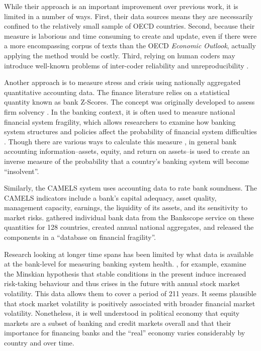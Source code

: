 \documentclass[]{article}
\begin{document}
While their approach is an important improvement over previous work, it is limited in a number of ways. First, their data sources means they are necessarily confined to the relatively small sample of OECD countries. Second, because their measure is laborious and time consuming to create and update, even if there were a more encompassing corpus of texts than the OECD \emph{Economic Outlook}, actually applying the method would be costly. Third, relying on human coders may introduce well-known problems of inter-coder reliability and unreproducibility \citep{Minhas2015}.

Another approach is to measure stress and crisis using nationally aggregated quantitative accounting data. The finance literature relies on a statistical quantity known as bank Z-Scores. The concept was originally developed to assess firm solvency \citep[see][]{roy1952}. In the banking context, it is often used to measure national financial system fragility, which allows researchers to examine how banking system structures and policies affect the probability of financial system difficulties \citep[e.g.][]{beck2013bank,vcihak2010islamic,laeven2009bank,uhde2009}. Though there are various ways to calculate this measure \citep[73]{Lepetit2013}, in general bank accounting information--assets, equity, and return on assets--is used to create an inverse measure of the probability that a country's banking system will become ``insolvent''.

Similarly, the CAMELS system uses accounting data to rate bank soundness. The CAMELS indicators include a bank's capital adequacy, asset quality, management capacity, earnings, the liquidity of its assets, and its sensitivity to market risks. \cite{Andrianova2015} gathered individual bank data from the Bankscope service on these quantities for 128 countries, created annual national aggregates, and released the components in a ``database on financial fragility''.

Research looking at longer time spans has been limited by what data is available at the bank-level for measuring banking system health. \cite{Danielsson2015}, for example, examine the Minskian \citeyearpar{Minsky1982} hypothesis that stable conditions in the present induce increased risk-taking behaviour and thus crises in the future with annual stock market volatility. This data allows them to cover a period of 211 years. It seems plausible that stock market volatility is positively associated with broader financial market volatility. Nonetheless, it is well understood in political economy \citep[seminally][]{hall2001introduction} that equity markets are a subset of banking and credit markets overall and that their importance for financing banks and the ``real'' economy varies considerably by country and over time.
\end{document}
